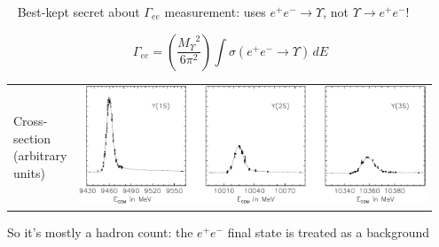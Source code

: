 \documentclass[landscape]{article}
\newenvironment{slide}{\mbox{ }\vfill}{\vfill \mbox{ } \pagebreak}
\begin{document}
\begin{slide}
Best-kept secret about $\Gamma_{ee}$ measurement: uses $e^+e^- \to
\Upsilon$, not $\Upsilon \to e^+e^-$!

\vfill
\[ \Gamma_{ee} = \left(\frac{{M_\Upsilon}^2}{6 \pi^2}\right) \int \sigma(e^+e^- \to \Upsilon) \, dE \]

\vfill
\begin{center}
  \begin{tabular}{l p{0.95\linewidth}}
    \begin{rotate}{90}\mbox{\hspace{0.8 cm}} \LARGE Cross-section (arbitrary units)\end{rotate} &
      \includegraphics[width=\linewidth]{onetwothree}
  \end{tabular}
\end{center}

\vfill
So it's mostly a hadron count: the $e^+e^-$ final state is treated as a background
\end{slide}
\end{document}
